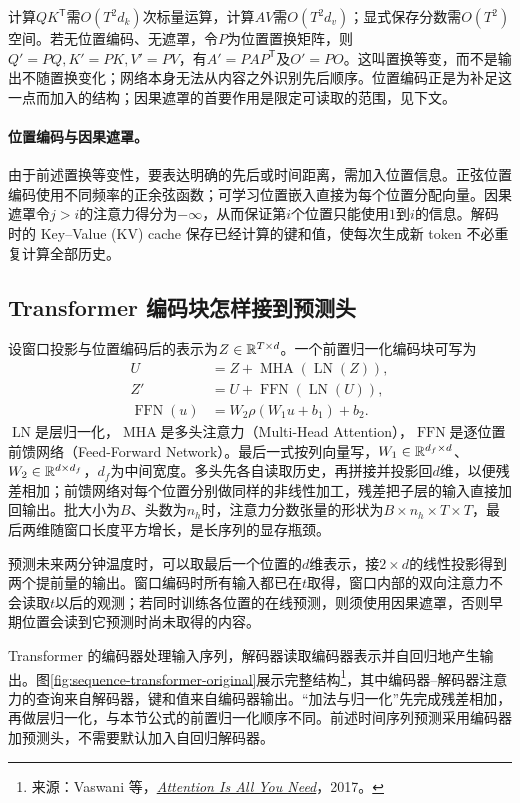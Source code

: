 计算$QK^{\mathsf T}$需$O(T^2d_k)$次标量运算，计算$AV$需$O(T^2d_v)$；显式保存分数需$O(T^2)$空间。若无位置编码、无遮罩，令$P$为位置置换矩阵，则$Q'=PQ,K'=PK,V'=PV$，有$A'=PAP^{\mathsf T}$及$O'=PO$。这叫置换等变，而不是输出不随置换变化；网络本身无法从内容之外识别先后顺序。位置编码正是为补足这一点而加入的结构；因果遮罩的首要作用是限定可读取的范围，见下文。

\paragraph{位置编码与因果遮罩。}
由于前述置换等变性，要表达明确的先后或时间距离，需加入位置信息。正弦位置编码使用不同频率的正余弦函数；可学习位置嵌入直接为每个位置分配向量。因果遮罩令$j>i$的注意力得分为$-\infty$，从而保证第$i$个位置只能使用$1$到$i$的信息。解码时的 Key--Value (KV) cache 保存已经计算的键和值，使每次生成新 token 不必重复计算全部历史。

\subsection{Transformer 编码块怎样接到预测头}
设窗口投影与位置编码后的表示为$Z\in\mathbb{R}^{T\times d}$。一个前置归一化编码块可写为
\begin{align}
 U&=Z+\operatorname{MHA}(\operatorname{LN}(Z)),\\
 Z'&=U+\operatorname{FFN}(\operatorname{LN}(U)),\\
 \operatorname{FFN}(u)&=W_2\rho(W_1u+b_1)+b_2.
\end{align}
$\operatorname{LN}$是层归一化，$\operatorname{MHA}$是多头注意力（Multi-Head Attention），$\operatorname{FFN}$是逐位置前馈网络（Feed-Forward Network）。最后一式按列向量写，$W_1\in\mathbb{R}^{d_f\times d}$、$W_2\in\mathbb{R}^{d\times d_f}$，$d_f$为中间宽度。多头先各自读取历史，再拼接并投影回$d$维，以便残差相加；前馈网络对每个位置分别做同样的非线性加工，残差把子层的输入直接加回输出。批大小为$B$、头数为$n_h$时，注意力分数张量的形状为$B\times n_h\times T\times T$，最后两维随窗口长度平方增长，是长序列的显存瓶颈。

预测未来两分钟温度时，可以取最后一个位置的$d$维表示，接$2\times d$的线性投影得到两个提前量的输出。窗口编码时所有输入都已在$t$取得，窗口内部的双向注意力不会读取$t$以后的观测；若同时训练各位置的在线预测，则须使用因果遮罩，否则早期位置会读到它预测时尚未取得的内容。

Transformer 的编码器处理输入序列，解码器读取编码器表示并自回归地产生输出。图\ref{fig:sequence-transformer-original}展示完整结构\footnote{\label{fn:sequence-transformer-structure-source}来源：Vaswani 等，\href{https://arxiv.org/abs/1706.03762}{\textit{Attention Is All You Need}}，2017。}，其中编码器--解码器注意力的查询来自解码器，键和值来自编码器输出。“加法与归一化”先完成残差相加，再做层归一化，与本节公式的前置归一化顺序不同。前述时间序列预测采用编码器加预测头，不需要默认加入自回归解码器。


